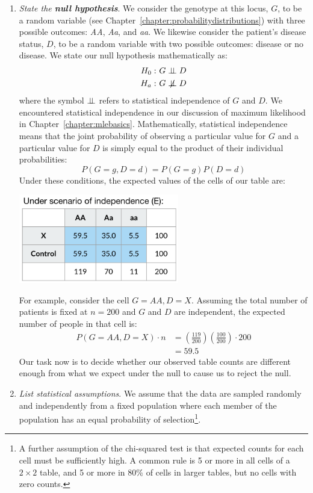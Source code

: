 \begin{enumerate}
\item \textit{State the \textbf{null hypothesis}}. We consider the genotype at this locus, $G$, to be a random variable (see Chapter~\ref{chapter:probabilitydistributions}) with three possible outcomes: \emph{AA}, \emph{Aa}, and \emph{aa}. We likewise consider the patient's disease status, $D$, to be a random variable with two possible outcomes: disease or no disease. We state our null hypothesis mathematically as: 
\begin{align*}
H_0: &~ G \independent D \\
H_a: &~ G \notindependent D
\end{align*}
where the symbol $\perp\mkern-9.5mu\perp$ refers to statistical independence of $G$ and $D$. We encountered statistical independence in our discussion of maximum likelihood in Chapter~\ref{chapter:mlebasics}. Mathematically, statistical independence means that the joint probability of observing a particular value for $G$ and a particular value for $D$ is simply equal to the product of their individual probabilities:
$$ P(G=g, D=d) = P(G=g) P(D=d) $$
Under these conditions, the expected values of the cells of our table are:
\begin{center}
\includegraphics[width=0.55\textwidth]{img/pearson-chisq-fig-2.png}
\end{center}
For example, consider the cell $G = AA, D = X$. Assuming the total number of patients is fixed at $n=200$ and $G$ and $D$ are independent, the expected number of people in that cell is: 
\begin{align*} P(G=AA, D=X) \cdot n &= \left(\frac{119}{200}\right) \left(\frac{100}{200}\right) \cdot 200 \\
&= \mathbf{59.5} \end{align*}
Our task now is to decide whether our observed table counts are different enough from what we expect under the null to cause us to reject the null. 

\item \textit{List statistical {assumptions}}. We assume that the data are sampled randomly and independently from a fixed population where each member of the population has an equal probability of selection\footnote{A further assumption of the chi-squared test is that expected counts for each cell must be sufficiently high. A common rule is 5 or more in all cells of a $2\times 2$ table, and 5 or more in 80\% of cells in larger tables, but no cells with zero counts.}. 


\end{enumerate}
